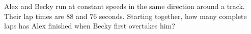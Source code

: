 Alex and Becky run at constant speeds in the same direction around a track. Their lap times are $88$ and $76$ seconds. Starting together, how many complete laps has Alex finished when Becky first overtakes him?

